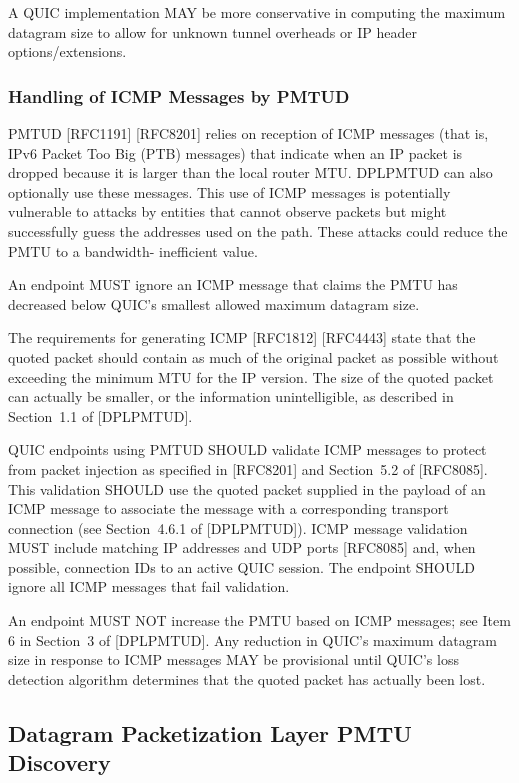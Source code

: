 \documentclass{article}
\begin{document}
A QUIC implementation MAY be more conservative in computing the maximum datagram size to allow for unknown tunnel overheads or IP header options/extensions.

\subsubsection{Handling of ICMP Messages by PMTUD}

PMTUD [RFC1191] [RFC8201] relies on reception of ICMP messages (that is, IPv6 Packet Too Big (PTB) messages) that indicate when an IP packet is dropped because it is larger than the local router MTU. DPLPMTUD can also optionally use these messages.  This use of ICMP messages is potentially vulnerable to attacks by entities that cannot observe packets but might successfully guess the addresses used on the path.  These attacks could reduce the PMTU to a bandwidth- inefficient value.

An endpoint MUST ignore an ICMP message that claims the PMTU has decreased below QUIC's smallest allowed maximum datagram size.

The requirements for generating ICMP [RFC1812] [RFC4443] state that the quoted packet should contain as much of the original packet as possible without exceeding the minimum MTU for the IP version.  The size of the quoted packet can actually be smaller, or the information unintelligible, as described in Section~1.1 of [DPLPMTUD].

QUIC endpoints using PMTUD SHOULD validate ICMP messages to protect from packet injection as specified in [RFC8201] and Section~5.2 of [RFC8085].  This validation SHOULD use the quoted packet supplied in the payload of an ICMP message to associate the message with a corresponding transport connection (see Section~4.6.1 of [DPLPMTUD]). ICMP message validation MUST include matching IP addresses and UDP ports [RFC8085] and, when possible, connection IDs to an active QUIC session.  The endpoint SHOULD ignore all ICMP messages that fail validation.

An endpoint MUST NOT increase the PMTU based on ICMP messages; see Item 6 in Section~3 of [DPLPMTUD].  Any reduction in QUIC's maximum datagram size in response to ICMP messages MAY be provisional until QUIC's loss detection algorithm determines that the quoted packet has actually been lost.

\subsection{Datagram Packetization Layer PMTU Discovery}
\end{document}
